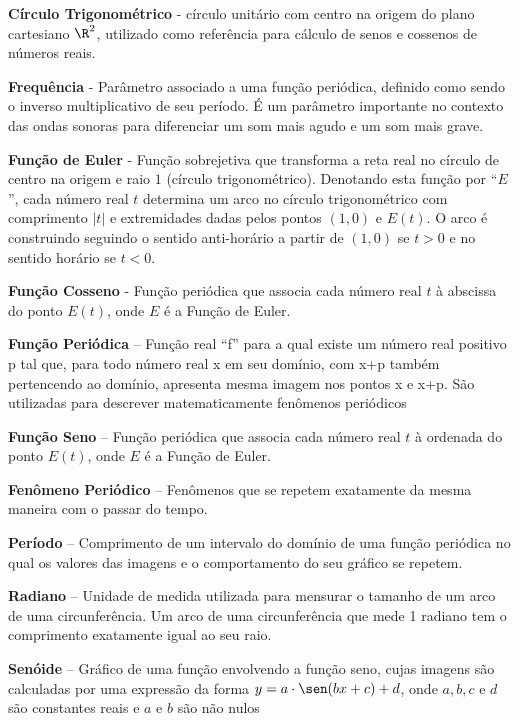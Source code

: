 \textbf{Círculo Trigonométrico} - círculo unitário com centro na origem do plano cartesiano $\R^2$, utilizado como referência para cálculo de senos e cossenos de números reais.

\textbf{Frequência} - Parâmetro associado a uma função periódica, definido como sendo o inverso multiplicativo de seu período. É um parâmetro importante no contexto das ondas sonoras para diferenciar um som mais agudo e um som mais grave. 

\textbf{Função de Euler} - Função sobrejetiva que transforma a reta real no círculo de centro na origem e raio $1$ (círculo trigonométrico). Denotando esta função por “$E$”, cada número real $t$ determina um arco no círculo trigonométrico com comprimento $|t|$ e extremidades dadas pelos pontos $(1,0)$ e $E(t)$. O arco é construindo seguindo o sentido anti-horário a partir de $(1,0)$ se $t > 0$ e no sentido horário se $t < 0$. 

\textbf{Função Cosseno}  - Função periódica que associa cada número real $t$ à abscissa do ponto $E(t)$, onde $E$ é a Função de Euler.

\textbf{Função Periódica} – Função real “f” para a qual existe um número real positivo p tal que,
para todo número real x em seu domínio, com x+p também pertencendo ao domínio,
apresenta mesma imagem nos pontos x e x+p. São utilizadas para descrever
matematicamente fenômenos periódicos

\textbf{Função Seno} – Função periódica que associa cada número real $t$ à ordenada do ponto $E(t)$, onde $E$ é a Função de Euler.

\textbf{Fenômeno Periódico} – Fenômenos que se repetem exatamente da mesma maneira com o passar do tempo.

\textbf{Período} – Comprimento de um intervalo do domínio de uma função periódica no qual os valores das imagens e o comportamento do seu gráfico se repetem.

\textbf{Radiano} – Unidade de medida utilizada para mensurar o tamanho de um arco de uma circunferência. Um arco de uma circunferência que mede 1 radiano tem o comprimento exatamente igual ao seu raio.

\textbf{Senóide} – Gráfico de uma função envolvendo a função seno, cujas imagens são calculadas por uma expressão da forma $y=a\cdot\sen(bx+c)+d$, onde $a,b,c$ e $d$ são constantes reais e $a$ e $b$ são não nulos

\ifnum{}
\clearpage
\else
\notasfinais
\fi




\nocite{*}


